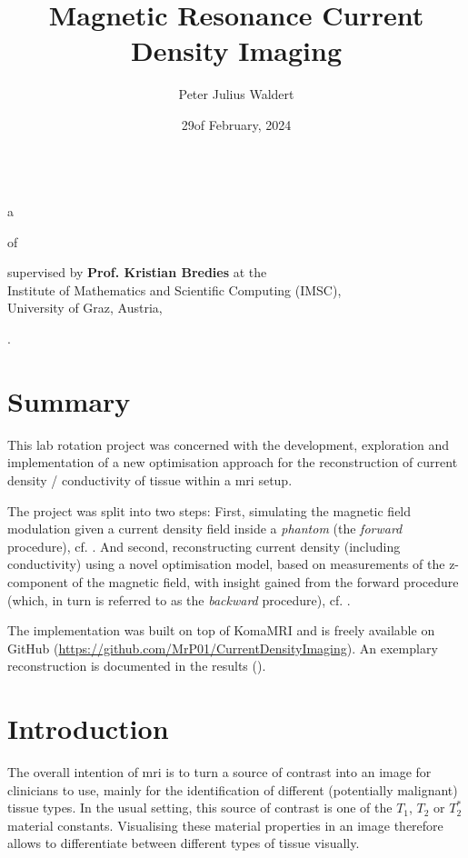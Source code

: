 \documentclass[10pt]{article}
\title{Magnetic Resonance Current Density Imaging}
\author{Peter Julius Waldert}
\date{29\th of February, 2024}
\begin{document}
  \makeatletter
  \begin{center}
    {\Huge \@title} \\
    a\hspace{.4em}{\large BioTechMed-Graz Lab Rotation Report}
    \vspace{.5cm}

    of\hspace{.5em}{\large \@author}
    \vspace{.3cm}

    supervised by \textbf{Prof. Kristian Bredies} at the \\
    Institute of Mathematics and Scientific Computing (IMSC), \\
    University of Graz, Austria,
    \vspace{.3cm}

    {\@date}.
  \end{center}
  \makeatother

  \section{Summary}
  This lab rotation project was concerned with the development, exploration and implementation of a new optimisation approach for the reconstruction of current density / conductivity of tissue within a \gls{mri} setup.

  The project was split into two steps: First, simulating the magnetic field modulation given a current density field inside a \textit{phantom} (the \textit{forward} procedure), cf. .
  And second, reconstructing current density (including conductivity) using a novel optimisation model, based on measurements of the z-component of the magnetic field, with insight gained from the forward procedure (which, in turn is referred to as the \textit{backward} procedure), cf. .

  The implementation was built on top of KomaMRI \parencite{2022-koma-mri} and is freely available on GitHub (\url{https://github.com/MrP01/CurrentDensityImaging}).
  An exemplary reconstruction is documented in the results ().

  \section{Introduction}
  The overall intention of \gls{mri} is to turn a source of contrast into an image for clinicians to use, mainly for the identification of different (potentially malignant) tissue types.
  In the usual setting, this source of contrast is one of the $T_1$, $T_2$ or $T_2^*$ material constants.
  Visualising these material properties in an image therefore allows to differentiate between different types of tissue visually.
\end{document}
